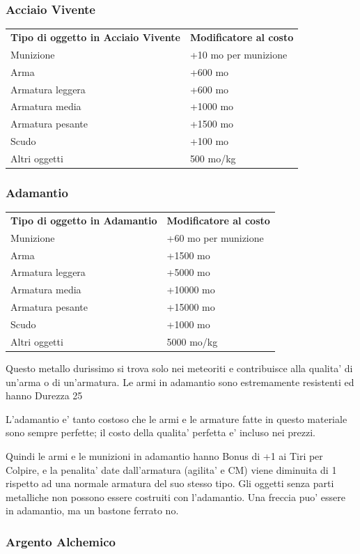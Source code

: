 \documentclass[a4paper,11pt,twoside,openany]{book}
\begin{document}
{\subsubsection{Acciaio Vivente}

\label{acciaio-vivente}

\begin{tabular}{ll}
\toprule 
\textbf{Tipo di oggetto in Acciaio Vivente} & \textbf{Modificatore al costo}\tabularnewline
Munizione & +10 mo per munizione\tabularnewline
Arma & +600 mo\tabularnewline
Armatura leggera & +600 mo\tabularnewline
Armatura media & +1000 mo\tabularnewline
Armatura pesante & +1500 mo\tabularnewline
Scudo & +100 mo\tabularnewline
Altri oggetti & 500 mo/kg\tabularnewline
\end{tabular}

\subsubsection{Adamantio}

\label{adamantio}

\begin{tabular}{ll}
\toprule 
\textbf{Tipo di oggetto in Adamantio} & \textbf{Modificatore al costo}\tabularnewline
Munizione & +60 mo per munizione\tabularnewline
Arma & +1500 mo\tabularnewline
Armatura leggera & +5000 mo\tabularnewline
Armatura media & +10000 mo\tabularnewline
Armatura pesante & +15000 mo\tabularnewline
Scudo & +1000 mo\tabularnewline
Altri oggetti & 5000 mo/kg\tabularnewline
\end{tabular}

Questo metallo durissimo si trova solo nei meteoriti e contribuisce alla qualita' di un'arma o di un'armatura. Le armi in adamantio sono estremamente resistenti ed hanno Durezza 25

L'adamantio e' tanto costoso che le armi e le armature fatte in questo materiale sono sempre perfette; il costo della qualita' perfetta e' incluso nei prezzi.

Quindi le armi e le munizioni in adamantio hanno Bonus di +1 ai Tiri per Colpire, e la penalita' date dall'armatura (agilita' e CM) viene diminuita di 1 rispetto ad una normale armatura del suo stesso tipo. Gli oggetti senza parti metalliche non possono essere costruiti con l'adamantio. Una freccia puo' essere in adamantio, ma un bastone ferrato
no.

\subsubsection{Argento Alchemico}

}
\end{document}
